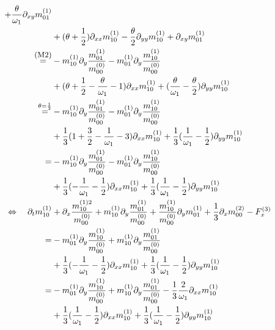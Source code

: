 \documentclass{article}
\begin{document}
\begin{align*}
    + \frac{\theta}{\omega_1}\partial_{xy} m_{01}^{(1)}
    \\ &
    + (\theta + \frac{1}{2}) \partial_{xx} m_{10}^{(1)}
    - \frac{\theta}{2}\partial_{yy} m_{10}^{(1)}
    + \partial_{xy} m_{01}^{(1)}
    \\ \overset{\text{\small(M2)}}{=} &
    -m_{10}^{(1)}\partial_y \frac{ m_{01}^{(1)}}{m_{00}^{(0)}}
    -m_{01}^{(1)}\partial_y \frac{ m_{10}^{(1)}}{m_{00}^{(0)}}
    \\ &
    + (\theta + \frac{1}{2} - \frac{\theta}{\omega_1} - 1) \partial_{xx} m_{10}^{(1)}
    + (\frac{\theta}{\omega_1}-\frac{\theta}{2})\partial_{yy} m_{10}^{(1)}
    \\ \overset{\theta=\frac{1}{3}}{=} &
    -m_{10}^{(1)}\partial_y \frac{ m_{01}^{(1)}}{m_{00}^{(0)}}
    -m_{01}^{(1)}\partial_y \frac{ m_{10}^{(1)}}{m_{00}^{(0)}}
    \\ &
    + \frac{1}{3}(1 + \frac{3}{2} - \frac{1}{\omega_1} - 3) \partial_{xx} m_{10}^{(1)}
    + \frac{1}{3}(\frac{1}{\omega_1}-\frac{1}{2})\partial_{yy} m_{10}^{(1)}
    \\ = &
    -m_{10}^{(1)}\partial_y \frac{ m_{01}^{(1)}}{m_{00}^{(0)}}
    -m_{01}^{(1)}\partial_y \frac{ m_{10}^{(1)}}{m_{00}^{(0)}}
    \\ &
    + \frac{1}{3}(- \frac{1}{\omega_1} - \frac{1}{2}) \partial_{xx} m_{10}^{(1)}
    + \frac{1}{3}(\frac{1}{\omega_1}-\frac{1}{2})\partial_{yy} m_{10}^{(1)}
    \\\Leftrightarrow\quad   \partial_t m_{10}^{(1)} &
    + \partial_x \frac{ m_{10}^{(1)2}}{ m_{00}^{(0)}}
    + m_{10}^{(1)}\partial_y \frac{ m_{01}^{(1)}}{m_{00}^{(0)}}
    + \frac{ m_{10}^{(1)}}{m_{00}^{(0)}}\partial_y m_{01}^{(1)}
    + \frac{1}{3}\partial_x m_{00}^{(2)}
    - F_x^{(3)}
    \\ = &
    - m_{01}^{(1)}\partial_y \frac{ m_{10}^{(1)}}{m_{00}^{(0)}}
    + m_{10}^{(1)}\partial_y \frac{ m_{01}^{(1)}}{m_{00}^{(0)}}
    \\ &
    + \frac{1}{3}(- \frac{1}{\omega_1} - \frac{1}{2}) \partial_{xx} m_{10}^{(1)}
    + \frac{1}{3}(\frac{1}{\omega_1}-\frac{1}{2})\partial_{yy} m_{10}^{(1)}
    \\ = &
    - m_{01}^{(1)}\partial_y \frac{ m_{10}^{(1)}}{m_{00}^{(0)}}
    + m_{10}^{(1)}\partial_y \frac{ m_{01}^{(1)}}{m_{00}^{(0)}}
    - \frac{1}{3}\frac{2}{\omega_1} \partial_{xx} m_{10}^{(1)}
    \\ &
    + \frac{1}{3}(\frac{1}{\omega_1} - \frac{1}{2}) \partial_{xx} m_{10}^{(1)}
    + \frac{1}{3}(\frac{1}{\omega_1} - \frac{1}{2})\partial_{yy} m_{10}^{(1)}

\end{align*}
\end{document}
